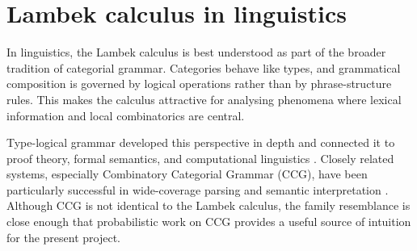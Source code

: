 \section{Lambek calculus in linguistics}
In linguistics, the Lambek calculus is best understood as part of the broader tradition of
categorial grammar. Categories behave like types, and grammatical composition is governed by
logical operations rather than by phrase-structure rules. This makes the calculus attractive for
analysing phenomena where lexical information and local combinatorics are central.

Type-logical grammar developed this perspective in depth and connected it to proof theory,
formal semantics, and computational linguistics \citep{Moortgat1997,Morrill1994}. Closely related
systems, especially Combinatory Categorial Grammar (CCG), have been particularly successful in
wide-coverage parsing and semantic interpretation \citep{Steedman2000,ClarkCurran2007}.
Although CCG is not identical to the Lambek calculus, the family resemblance is close enough
that probabilistic work on CCG provides a useful source of intuition for the present project.

